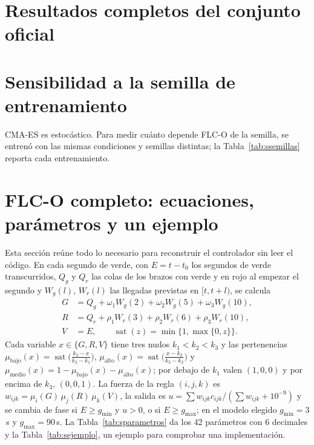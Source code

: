 \documentclass[journal]{IEEEtran}
\newcommand{\FLC}{FLC-O}
\begin{document}


\section{Resultados completos del conjunto oficial}
\label{sec:s-pares}


\section{Sensibilidad a la semilla de entrenamiento}
\label{sec:s-semillas}
CMA-ES es estocástico. Para medir cuánto depende \FLC{} de la semilla, se entrenó con las mismas condiciones y semillas distintas; la Tabla~\ref{tab:ssemillas} reporta cada entrenamiento.



\section{FLC-O completo: ecuaciones, parámetros y un ejemplo}
\label{sec:s-flco}
Esta sección reúne todo lo necesario para reconstruir el controlador sin leer el código. En cada segundo de verde, con $E=t-t_0$ los segundos de verde transcurridos, $Q_g$ y $Q_r$ las colas de los brazos con verde y en rojo al empezar el segundo y $W_g(l)$, $W_r(l)$ las llegadas previstas en $[t,t+l)$, se calcula
\begin{align*}
G&=Q_g+\omega_1W_g(2)+\omega_2W_g(5)+\omega_3W_g(10),\\
R&=Q_r+\rho_1W_r(3)+\rho_2W_r(6)+\rho_3W_r(10),\\
V&=E,\qquad \operatorname{sat}(z)=\min\{1,\max\{0,z\}\}.
\end{align*}
Cada variable $x\in\{G,R,V\}$ tiene tres nudos $k_1<k_2<k_3$ y las pertenencias $\mu_{\text{bajo}}(x)=\operatorname{sat}\bigl(\tfrac{k_2-x}{k_2-k_1}\bigr)$, $\mu_{\text{alto}}(x)=\operatorname{sat}\bigl(\tfrac{x-k_2}{k_3-k_2}\bigr)$ y $\mu_{\text{medio}}(x)=1-\mu_{\text{bajo}}(x)-\mu_{\text{alto}}(x)$; por debajo de $k_1$ valen $(1,0,0)$ y por encima de $k_3$, $(0,0,1)$. La fuerza de la regla $(i,j,k)$ es $w_{ijk}=\mu_i(G)\,\mu_j(R)\,\mu_k(V)$, la salida es $u=\sum w_{ijk}c_{ijk}/(\sum w_{ijk}+10^{-9})$ y se cambia de fase si $E\ge g_{\min}$ y $u>0$, o si $E\ge g_{\max}$; en el modelo elegido $g_{\min}=3$\,s y $g_{\max}=90$\,s. La Tabla~\ref{tab:sparametros} da los 42 parámetros con 6 decimales y la Tabla~\ref{tab:sejemplo}, un ejemplo para comprobar una implementación.
\end{document}
